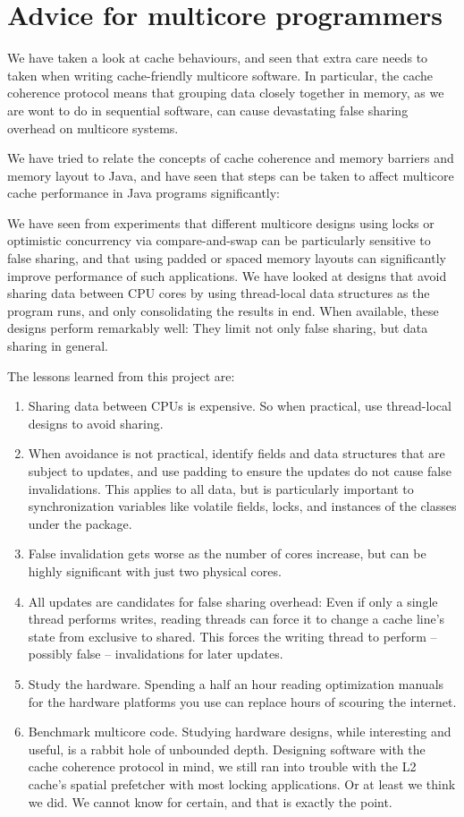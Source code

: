 \chapter{Advice for multicore programmers}
\label{chap:advice}
We have taken a look at cache behaviours, and seen that extra care needs to
taken when writing cache-friendly multicore software.
In particular, the cache coherence protocol means that grouping data closely
together in memory, as we are wont to do in sequential software, can cause
devastating false sharing overhead on multicore systems.

We have tried to relate the concepts of cache coherence and memory barriers and
memory layout to Java, and have seen that steps can be taken to affect multicore
cache performance in Java programs significantly:

We have seen from experiments that different multicore designs using locks or
optimistic concurrency via compare-and-swap can be particularly sensitive to
false sharing, and that using padded or spaced memory layouts can significantly
improve performance of such applications. We have looked at designs that avoid
sharing data between CPU cores by using thread-local data structures as the
program runs, and only consolidating the results in end. When available, these
designs perform remarkably well: They limit not only false sharing, but data
sharing in general.

The lessons learned from this project are:
\begin{enumerate}
\item Sharing data between CPUs is expensive. So when practical, use
thread-local designs to avoid sharing.
\item When avoidance is not practical, identify fields and data structures that
are subject to updates, and use padding to ensure the updates do not cause false
invalidations. This applies to all data, but is particularly important to synchronization variables like
volatile fields, locks, and instances of the classes under the
 package.
\item False invalidation gets worse as the number of cores increase, but can be
	highly significant with just two physical cores.
\item All updates are candidates for false sharing overhead: Even if only a
single thread performs writes, reading threads can force it to change a cache
line's state from exclusive to shared. This forces the writing thread to perform --
possibly false -- invalidations for later updates.
\item Study the hardware. Spending a half an hour reading optimization manuals for the hardware
platforms you use can replace hours of scouring the internet.
\item Benchmark multicore code. Studying hardware designs, while interesting
and useful, is a rabbit hole of unbounded depth. Designing software with the
cache coherence protocol in mind, we still ran into trouble with the L2 cache's
spatial prefetcher with most locking applications. Or at least we think we did.
We cannot know for certain, and that is exactly the point.
\end{enumerate}

